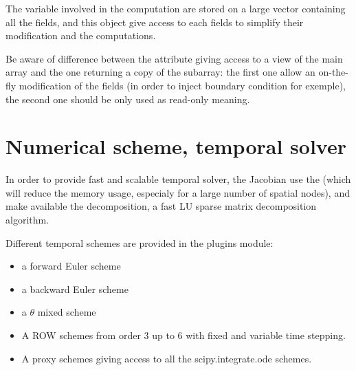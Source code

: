 \documentclass[letterpaper,10pt,english]{sphinxmanual}
\begin{document}
The variable involved in the computation are stored on a large vector containing all the fields, and this object give access to each fields to simplify their modification and the computations.

\begin{sphinxVerbatim}[commandchars=\\\{\}]
\PYG{p}{[}\PYG{p}{]}  
\end{sphinxVerbatim}

Be aware of difference between the attribute giving access to a view of the main array and the one returning a copy of the subarray: the first one allow an on-the-fly modification of the fields (in order to inject boundary condition for exemple), the second one should be only used as read-only meaning.


\section{Numerical scheme, temporal solver}
\label{\detokenize{overview:numerical-scheme-temporal-solver}}
In order to provide fast and scalable temporal solver, the Jacobian use the  (which will reduce the memory usage, especialy for a large number of spatial nodes), and make available the  decomposition, a fast LU sparse matrix decomposition algorithm.

Different temporal schemes are provided in the plugins module:
\begin{itemize}
\item {} 
a forward Euler scheme

\item {} 
a backward Euler scheme

\item {} 
a \(\theta\) mixed scheme

\item {} 
A ROW schemes from order 3 up to 6 with fixed and variable time stepping.

\item {} 
A proxy schemes giving access to all the scipy.integrate.ode schemes.

\end{itemize}
\end{document}
